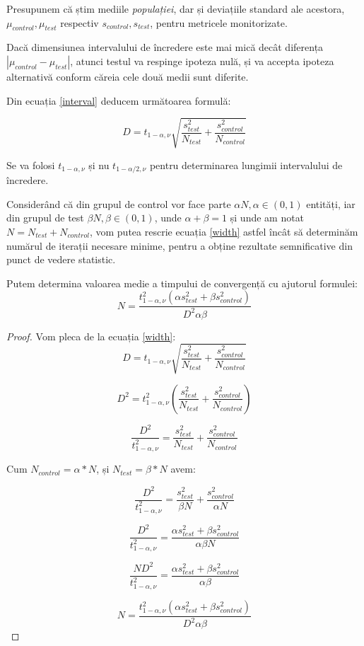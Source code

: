 Presupunem că știm mediile \textit{populației}, dar și deviațiile standard ale acestora, $\mu_{control}, \mu_{test}$ respectiv $s_{control}, s_{test}$, pentru metricele monitorizate.

\begin{theorem}
	\label{widthobs}
	Dacă dimensiunea intervalului de încredere este mai mică decât diferența $|\mu_{control} - \mu_{test}|$, atunci testul va respinge ipoteza nulă, și va accepta ipoteza alternativă conform căreia cele două medii sunt diferite.
\end{theorem}

Din ecuația \ref{interval} deducem următoarea formulă: 

\begin{equation}
\label{width}
D =  t_{1 - \alpha, \nu} \sqrt{ {\frac{s_{test}^2}{N_{test}} }+ {\frac{s_{control}^2}{N_{control}}}}
\end{equation}

\begin{theorem}
	Se va folosi $ t_{1 - \alpha, \nu}$ și nu $ t_{1 - \alpha/2, \nu}$ pentru determinarea lungimii intervalului de încredere.
\end{theorem}

Considerând că din grupul de control vor face parte $\alpha N, \alpha \in (0, 1)$ entități, iar din grupul de test $\beta N, \beta \in (0, 1)$, unde $\alpha + \beta = 1$ și unde am notat $N = N_{test} + N_{control}$, vom putea rescrie ecuația \ref{width} astfel încât să determinăm numărul de iterații necesare minime, pentru a obține rezultate semnificative din punct de vedere statistic.

\begin{theorem}
	Putem determina valoarea medie a timpului de convergență cu ajutorul formulei:
\label{requiredsample}
\[
N =  \frac{
	t_{1 - \alpha, \nu}^2 (\alpha s_{test}^2 + \beta s_{control}^2 )
	}{
	D^2 \alpha \beta
	}
\]
\end{theorem}

\begin{proof}
	Vom pleca de la ecuația \ref{width}:
\[
D =  t_{1 - \alpha, \nu} \sqrt{ {\frac{s_{test}^2}{N_{test}} }+ {\frac{s_{control}^2}{N_{control}}}}
\]	

\[
D^2 =  t_{1 - \alpha, \nu}^2 ({\frac{s_{test}^2}{N_{test}} }+ {\frac{s_{control}^2}{N_{control}}})
\]	

\[
\frac{D^2}{ t_{1 - \alpha, \nu}^2 }= {\frac{s_{test}^2}{N_{test}} }+ {\frac{s_{control}^2}{N_{control}}}
\]	

Cum $N_{control} = \alpha * N$, și $N_{test}  = \beta * N$ avem:

\[
\frac{D^2}{ t_{1 - \alpha, \nu}^2 }= {\frac{s_{test}^2}{\beta N} }+ {\frac{s_{control}^2}{\alpha N}}
\]	

\[
\frac{D^2}{ t_{1 - \alpha, \nu}^2 }= \frac{\alpha s_{test}^2 + \beta s_{control}^2}{\alpha \beta N}
\]

\[
\frac{N D^2}{ t_{1 - \alpha, \nu}^2 }= \frac{\alpha s_{test}^2 + \beta s_{control}^2}{\alpha \beta}
\]

\[
N =  \frac{
	t_{1 - \alpha, \nu}^2 (\alpha s_{test}^2 + \beta s_{control}^2 )
}{
D^2 \alpha \beta
}
\]
\end{proof}

